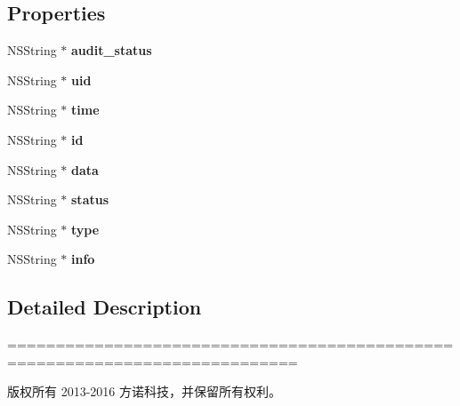 \subsection*{Properties}
\begin{DoxyCompactItemize}
\item 
\mbox{\label{interface_shakehistory_model_a5d60d4584e0cf487c76d84d62c3cde16}} 
N\+S\+String $\ast$ {\bfseries audit\+\_\+status}
\item 
\mbox{\label{interface_shakehistory_model_aa2f1414c2b175e03c506607335edc662}} 
N\+S\+String $\ast$ {\bfseries uid}
\item 
\mbox{\label{interface_shakehistory_model_ae8832a6adfce2c27d5f5b894a587783f}} 
N\+S\+String $\ast$ {\bfseries time}
\item 
\mbox{\label{interface_shakehistory_model_a04401977cca439ddfa6098be8515d252}} 
N\+S\+String $\ast$ {\bfseries id}
\item 
\mbox{\label{interface_shakehistory_model_a17d0e114bedfe16760285b85c4b2ef12}} 
N\+S\+String $\ast$ {\bfseries data}
\item 
\mbox{\label{interface_shakehistory_model_ad339e9d306383832384cabe7358fefd7}} 
N\+S\+String $\ast$ {\bfseries status}
\item 
\mbox{\label{interface_shakehistory_model_ac0b0bac5944430a6e7578dd1cdff3e9a}} 
N\+S\+String $\ast$ {\bfseries type}
\item 
\mbox{\label{interface_shakehistory_model_a461297c3018d4012767e2f70920620f9}} 
N\+S\+String $\ast$ {\bfseries info}
\end{DoxyCompactItemize}


\subsection{Detailed Description}
============================================================================

版权所有 2013-\/2016 方诺科技，并保留所有权利。


